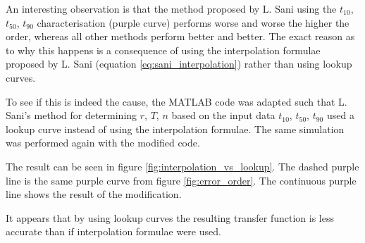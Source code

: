 An interesting observation is that the method proposed by L. Sani\cite{ref:sani}
using the $t_{10}$, $t_{50}$,  $t_{90}$ characterisation (purple curve) performs
worse and worse the higher the order, whereas all  other  methods perform better
and  better.  The exact reason as to why this happens is a consequence of  using
the    interpolation     formulae     proposed     by    L.    Sani    (equation
\ref{eq:sani_interpolation}) rather than using lookup curves.

To  see  if  this  is indeed the cause, the MATLAB code was adapted such that L.
Sani's  method  for determining $r$, $T$, $n$ based on the input data  $t_{10}$,
$t_{50}$, $t_{90}$ used  a  lookup  curve  instead  of  using  the interpolation
formulae. The same simulation was performed again with the modified code.

The result  can  be seen in figure \ref{fig:interpolation_vs_lookup}. The dashed
purple  line  is  the same purple curve from figure  \ref{fig:error_order}.  The
continuous purple line shows the result of the modification.

It appears that by using lookup curves the resulting  transfer  function is less
accurate than if interpolation formulae were used.
